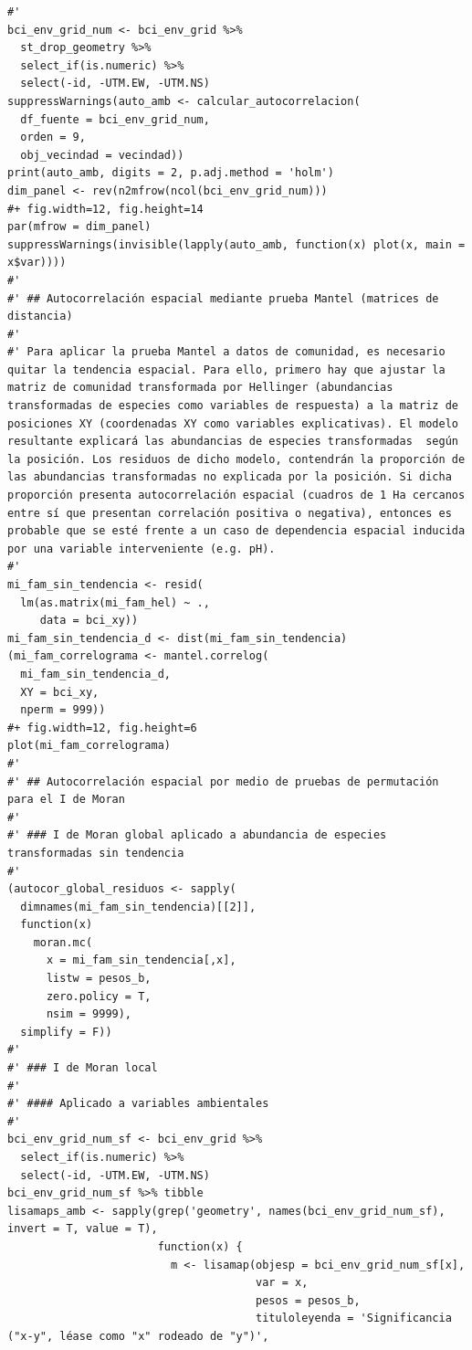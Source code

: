 \documentclass[11pt,]{article}
\begin{document}
\begin{verbatim}
#' 
bci_env_grid_num <- bci_env_grid %>%
  st_drop_geometry %>% 
  select_if(is.numeric) %>% 
  select(-id, -UTM.EW, -UTM.NS)
suppressWarnings(auto_amb <- calcular_autocorrelacion(
  df_fuente = bci_env_grid_num,
  orden = 9,
  obj_vecindad = vecindad))
print(auto_amb, digits = 2, p.adj.method = 'holm')
dim_panel <- rev(n2mfrow(ncol(bci_env_grid_num)))
#+ fig.width=12, fig.height=14
par(mfrow = dim_panel)
suppressWarnings(invisible(lapply(auto_amb, function(x) plot(x, main = x$var))))
#' 
#' ## Autocorrelación espacial mediante prueba Mantel (matrices de distancia)
#' 
#' Para aplicar la prueba Mantel a datos de comunidad, es necesario quitar la tendencia espacial. Para ello, primero hay que ajustar la matriz de comunidad transformada por Hellinger (abundancias transformadas de especies como variables de respuesta) a la matriz de posiciones XY (coordenadas XY como variables explicativas). El modelo resultante explicará las abundancias de especies transformadas  según la posición. Los residuos de dicho modelo, contendrán la proporción de las abundancias transformadas no explicada por la posición. Si dicha proporción presenta autocorrelación espacial (cuadros de 1 Ha cercanos entre sí que presentan correlación positiva o negativa), entonces es probable que se esté frente a un caso de dependencia espacial inducida por una variable interveniente (e.g. pH).
#' 
mi_fam_sin_tendencia <- resid(
  lm(as.matrix(mi_fam_hel) ~ .,
     data = bci_xy))
mi_fam_sin_tendencia_d <- dist(mi_fam_sin_tendencia)
(mi_fam_correlograma <- mantel.correlog(
  mi_fam_sin_tendencia_d,
  XY = bci_xy,
  nperm = 999))
#+ fig.width=12, fig.height=6
plot(mi_fam_correlograma)
#' 
#' ## Autocorrelación espacial por medio de pruebas de permutación para el I de Moran
#' 
#' ### I de Moran global aplicado a abundancia de especies transformadas sin tendencia
#' 
(autocor_global_residuos <- sapply(
  dimnames(mi_fam_sin_tendencia)[[2]],
  function(x)
    moran.mc(
      x = mi_fam_sin_tendencia[,x],
      listw = pesos_b,
      zero.policy = T,
      nsim = 9999),
  simplify = F))
#' 
#' ### I de Moran local
#' 
#' #### Aplicado a variables ambientales
#' 
bci_env_grid_num_sf <- bci_env_grid %>%
  select_if(is.numeric) %>% 
  select(-id, -UTM.EW, -UTM.NS)
bci_env_grid_num_sf %>% tibble
lisamaps_amb <- sapply(grep('geometry', names(bci_env_grid_num_sf), invert = T, value = T),
                       function(x) {
                         m <- lisamap(objesp = bci_env_grid_num_sf[x],
                                      var = x,
                                      pesos = pesos_b,
                                      tituloleyenda = 'Significancia ("x-y", léase como "x" rodeado de "y")',

\end{verbatim}
\end{document}
